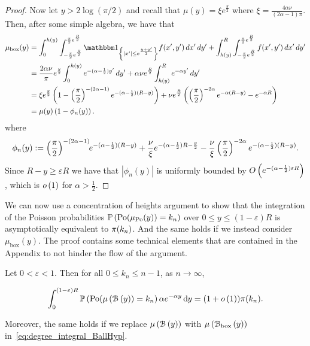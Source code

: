 \begin{proof}
Now let $y > 2 \log(\pi/2)$ and recall that $\mu(y) = \xi e^{\frac{y}{2}}$ where $\xi = \frac{4\alpha \nu}{(2\alpha - 1)\pi}$. Then, after some simple algebra, we have that
\begin{align*}
	\mu_{\mathrm{box}}(y)
	&= \int_0^{h(y)} \int_{-\frac{\pi}{2}e^{\frac{R}{2}}}^{\frac{\pi}{2}e^{\frac{R}{2}}} 
		\ind{|x^\prime| \le e^{\frac{y+y^\prime}{2}}} f(x^\prime,y^\prime) \, dx^\prime \, dy^\prime
		+ \int_{h(y)}^{R} \int_{-\frac{\pi}{2}e^{\frac{R}{2}}}^{\frac{\pi}{2}e^{\frac{R}{2}}} 
		f(x^\prime,y^\prime) \, dx^\prime \, dy^\prime\\
	&= \frac{2 \alpha \nu}{\pi} e^{\frac{y}{2}} \int_0^{h(y)} e^{-(\alpha - \frac{1}{2})y^\prime} \, dy^\prime
		+ \alpha \nu e^{\frac{R}{2}} \int_{h(y)}^{R} e^{-\alpha y^\prime} \, dy^\prime \\
	&= \xi e^{\frac{y}{2}}\left(1 - \left(\frac{\pi}{2}\right)^{-(2\alpha - 1)} 
		e^{-(\alpha - \frac{1}{2})(R - y)}\right)
	+ \nu e^{\frac{R}{2}}\left(\left(\frac{\pi}{2}\right)^{-2\alpha} e^{-\alpha(R - y)} 
		- e^{-\alpha R}\right)\\
	&= \mu(y)\left(1 - \phi_n(y) \right).
\end{align*}
where 
\[
	\phi_n(y) :=  \left(\frac{\pi}{2}\right)^{-(2\alpha - 1)} \hspace{-3pt} e^{-(\alpha - \frac{1}{2})(R - y)}
				+ \frac{\nu}{\xi}e^{-(\alpha - \frac{1}{2})R - \frac{y}{2}} - \frac{\nu}{\xi}\left(\frac{\pi}{2}\right)^{-2\alpha} e^{-(\alpha-\frac{1}{2})(R - y)}.
\]
Since $R - y \ge \varepsilon R$ we have that $|\phi_n(y)|$ is uniformly bounded by
$O\left(e^{-(\alpha - \frac{1}{2})\varepsilon R}\right)$, which is $o\left(1\right)$ for $\alpha > \frac{1}{2}$. 
\end{proof}

We can now use a concentration of heights argument to show that the integration of the Poisson probabilities $\mathbb{P}\left({\mathrm{Po}}(\mu_{{\mathrm{Po}}}(y)) = k_n\right)$ over $0 \le y \le (1-\varepsilon) R$ is asymptotically equivalent to ${\pi}(k_n)$. And the same holds if we instead consider $\mu_{\mathrm{box}}(y)$. The proof contains some technical elements that are contained in the Appendix to not hinder the flow of the argument. 

\begin{lemma}\label{lem:degree_integral}
Let $0 < \varepsilon < 1$. Then for all $0 \le k_n \le n - 1$, as $n \to \infty$,

\begin{equation}\label{eq:degree_integral_BallHyp}
	\int_0^{(1-\varepsilon)R} \mathbb{P}\left({\mathrm{Po}}(\mu\left({\mathcal B}\left(y\right)\right) = k_n\right) \alpha e^{-\alpha y} \operatorname{\mathrm{d}\hspace{-2pt}} y
	= (1+o\left(1\right)) {\pi}(k_n).
\end{equation}

Moreover, the same holds if we replace $\mu\left({\mathcal B}\left(y\right)\right)$ with $\mu\left({\mathcal B}_{\text{box}}\left(y\right)\right)$ in~\eqref{eq:degree_integral_BallHyp}.
\end{lemma}

